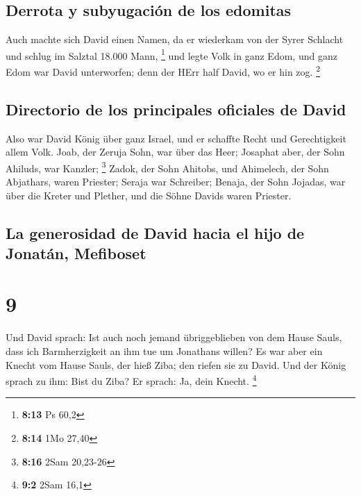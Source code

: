 \hypertarget{derrota-y-subyugaciuxf3n-de-los-edomitas}{%
\subsection{Derrota y subyugación de los
edomitas}\label{derrota-y-subyugaciuxf3n-de-los-edomitas}}

 Auch machte sich David einen Namen, da er wiederkam von
der Syrer Schlacht und schlug im Salztal 18.000 Mann, \footnote{\textbf{8:13}
  Ps 60,2}  und legte Volk in ganz Edom, und ganz Edom
war David unterworfen; denn der HErr half David, wo er hin zog.
\footnote{\textbf{8:14} 1Mo 27,40}

\hypertarget{directorio-de-los-principales-oficiales-de-david}{%
\subsection{Directorio de los principales oficiales de
David}\label{directorio-de-los-principales-oficiales-de-david}}

 Also war David König über ganz Israel, und er schaffte
Recht und Gerechtigkeit allem Volk.  Joab, der Zeruja
Sohn, war über das Heer; Josaphat aber, der Sohn Ahiluds, war Kanzler;
\footnote{\textbf{8:16} 2Sam 20,23-26}  Zadok, der Sohn
Ahitobs, und Ahimelech, der Sohn Abjathars, waren Priester; Seraja war
Schreiber;  Benaja, der Sohn Jojadas, war über die Kreter
und Plether, und die Söhne Davids waren Priester.

\hypertarget{la-generosidad-de-david-hacia-el-hijo-de-jonatuxe1n-mefiboset}{%
\subsection{La generosidad de David hacia el hijo de Jonatán,
Mefiboset}\label{la-generosidad-de-david-hacia-el-hijo-de-jonatuxe1n-mefiboset}}

\hypertarget{section-8}{%
\section{9}\label{section-8}}

 Und David sprach: Ist auch noch jemand übriggeblieben von
dem Hause Sauls, dass ich Barmherzigkeit an ihm tue um Jonathans willen?
 Es war aber ein Knecht vom Hause Sauls, der hieß Ziba;
den riefen sie zu David. Und der König sprach zu ihm: Bist du Ziba? Er
sprach: Ja, dein Knecht. \footnote{\textbf{9:2} 2Sam 16,1}

